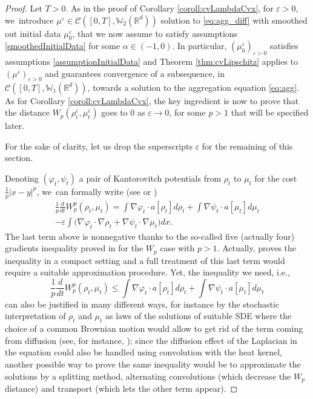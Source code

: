 \documentclass[11pt]{article}
\newcommand{\ie}{i.e.,\xspace}
\numberwithin{equation}{section}
\def\RR{\mathbb{R}}
\def\WW{\mathbb{W}}
\def\eps{\varepsilon}
\def\calC{{\mathcal C}}
\theoremstyle{plain}
\theoremstyle{definition}
\begin{document}
\begin{proof}
Let $T>0$. As in the proof of Corollary \ref{coroll:cvLambdaCvx}, for $\eps > 0$, we~introduce $\mu^\eps \in \calC([0,T], \WW_2(\RR^d))$ solution to \eqref{eq:agg_diff} with smoothed out initial data $\mu_0^\eps$, that we now assume to satisfy assumptions \eqref{smoothedInitialData} for some $\alpha \in (-1,0)$. In particular, $(\mu_0^\eps)_{\eps > 0}$ satisfies assumptions \eqref{assumptionInitialData} and Theorem \ref{thm:cvLipschitz} applies to $(\mu^\eps)_{\eps>0}$ and guarantees convergence of a subsequence, in $\calC([0,T], \WW_1(\RR^d))$, towards a solution to the aggregation equation \eqref{eq:agg}. As for Corollary \ref{coroll:cvLambdaCvx}, the key ingredient is now to prove that the distance $W_p(\rho_t^\eps, \mu_t^\eps)$ goes to 0 as $\eps \to 0$, for some $p > 1$ that will be specified later.

For the sake of clarity, let us drop the superscripts $\eps$ for the remaining of this section.

Denoting $(\varphi_t, \psi_t)$ a pair of Kantorovitch potentials from $\rho_t$ to $\mu_t$ for the cost $\frac{1}{p}|x-y|^p$, we~can formally write (see \cite[Th.\,5.24]{otam15} or \cite[Th.\,8.4.7]{ambrosio08})
\begin{multline*}
\frac 1p \frac{d}{dt} W_p^p(\rho_t, \mu_t) = \int \nabla \varphi_t \cdot a[\rho_t] d\rho_t
+ \int \nabla \psi_t \cdot a[\mu_t] d\mu_t \\
- \eps \int \Big(\nabla \varphi_t \cdot \nabla \rho_t + \nabla \psi_t \cdot \nabla \mu_t \Big) dx.
\end{multline*}
The last term above is nonnegative thanks to the so-called five (actually four) gradients inequality proved in \cite{caillet21} for the $W_p$ case with $p>1$. Actually, \cite{caillet21} proves the inequality in a compact setting and a full treatment of this last term would require a suitable approximation procedure. Yet, the inequality we need, \ie
\[
\frac 1p \frac{d}{dt} W_p^p(\rho_t, \mu_t) \leq \int \nabla \varphi_t \cdot a[\rho_t] d\rho_t + \int \nabla \psi_t \cdot a[\mu_t] d\mu_t
\]
can also be justified in many different ways, for instance by the stochastic interpretation of $\rho_t$ and $\mu_t$ as laws of the solutions of suitable SDE where the choice of a common Brownian motion would allow to get rid of the term coming from diffusion (see, for instance, \cite{BolGenGui}); since the diffusion effect of the Laplacian in the equation could also be handled using convolution with the heat kernel, another possible way to prove the same inequality would be to approximate the solutions by a splitting method, alternating convolutions (which decrease the $W_p$ distance) and transport (which lets the other term appear).


\end{proof}
\end{document}
